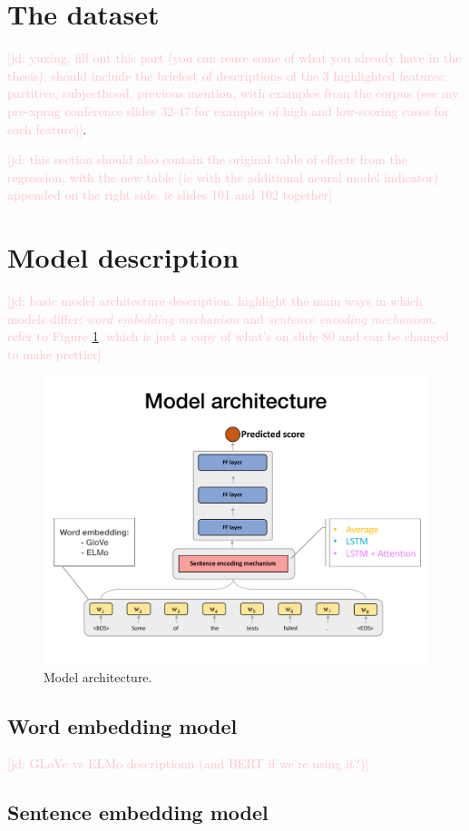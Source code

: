 \documentclass[10pt,letterpaper]{article}
\newcommand{\jd}[1]{\textcolor{Pink}{[jd: #1]}}
\newcommand{\figref}[1]{Figure \ref{#1}}
\begin{document}
\section{The dataset}

\jd{yuxing, fill out this part (you can reuse some of what you already have in the thesis). should include the briefest of descriptions of the 3 highlighted features: partitive, subjecthood, previous mention, with examples from the corpus (see my pre-xprag conference slides 32-47 for examples of high and low-scoring cases for each feature)}.

\jd{this section should also contain the original table of effects from the regression, with the new table (ie with the additional neural model indicator) appended on the right side, ie slides 101 and 102 together}

\section{Model description}

\jd{basic model architecture description. highlight the main ways in which models differ: \emph{word embedding mechanism} and \emph{sentence encoding mechanism}. refer to \figref{fig:modelarchitecture}, which is just a copy of what's on slide 80 and can be changed to make prettier}

\begin{figure}
	\includegraphics[width=.5\textwidth]{images/modelarchitecture}
	\caption{Model architecture.}
	\label{fig:modelarchitecture}
\end{figure}

\subsection{Word embedding model}

\jd{GLoVe vs ELMo descriptionn (and BERT if we're using it?)}

\subsection{Sentence embedding model}
\end{document}

